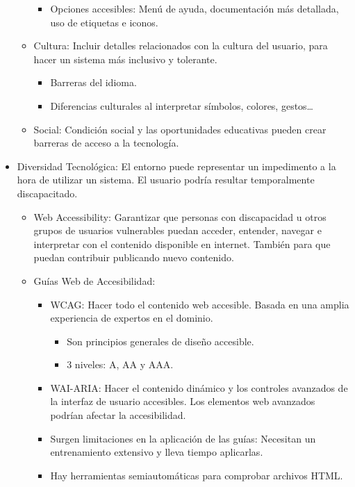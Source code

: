 \documentclass[12pt, twoside, openright]{report} %
\begin{document}
\begin{itemize}
\begin{itemize}
\begin{itemize}
      \item
        Opciones accesibles: Menú de ayuda, documentación más detallada,
        uso de etiquetas e iconos.
      \end{itemize}
    \item
      Cultura: Incluir detalles relacionados con la cultura del usuario,
      para hacer un sistema más inclusivo y tolerante.

      \begin{itemize}
      
      \item
        Barreras del idioma.
      \item
        Diferencias culturales al interpretar símbolos, colores,
        gestos\ldots{}
      \end{itemize}
    \item
      Social: Condición social y las oportunidades educativas pueden
      crear barreras de acceso a la tecnología.
    \end{itemize}
  \item
    Diversidad Tecnológica: El entorno puede representar un impedimento
    a la hora de utilizar un sistema. El usuario podría resultar
    temporalmente discapacitado.

    \begin{itemize}
    
    \item
      Web Accessibility: Garantizar que personas con discapacidad u
      otros grupos de usuarios vulnerables puedan acceder, entender,
      navegar e interpretar con el contenido disponible en internet.
      También para que puedan contribuir publicando nuevo contenido.
    \item
      Guías Web de Accesibilidad:

      \begin{itemize}
      
      \item
        WCAG: Hacer todo el contenido web accesible. Basada en una
        amplia experiencia de expertos en el dominio.

        \begin{itemize}
        
        \item
          Son principios generales de diseño accesible.
        \item
          3 niveles: A, AA y AAA.
        \end{itemize}
      \item
        WAI-ARIA: Hacer el contenido dinámico y los controles avanzados
        de la interfaz de usuario accesibles. Los elementos web
        avanzados podrían afectar la accesibilidad.
      \item
        Surgen limitaciones en la aplicación de las guías: Necesitan un
        entrenamiento extensivo y lleva tiempo aplicarlas.
      \item
        Hay herramientas semiautomáticas para comprobar archivos HTML.
      \end{itemize}
    \end{itemize}
  \end{itemize}
\end{document}
